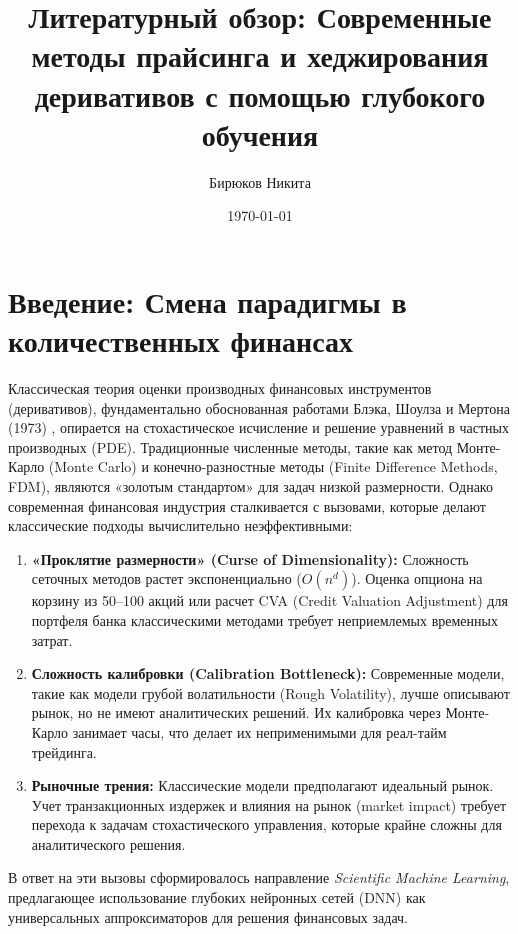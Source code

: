 \documentclass[12pt, a4paper]{article}
\title{\textbf{Литературный обзор: Современные методы прайсинга и хеджирования деривативов с помощью глубокого обучения}}
\author{Бирюков Никита}
\date{\today}
\begin{document}
\maketitle
\tableofcontents
\newpage

\section{Введение: Смена парадигмы в количественных финансах}

Классическая теория оценки производных финансовых инструментов (деривативов), фундаментально обоснованная работами Блэка, Шоулза и Мертона (1973) \cite{BlackScholes1973}, опирается на стохастическое исчисление и решение уравнений в частных производных (PDE). Традиционные численные методы, такие как метод Монте-Карло (Monte Carlo) и конечно-разностные методы (Finite Difference Methods, FDM), являются «золотым стандартом» для задач низкой размерности. Однако современная финансовая индустрия сталкивается с вызовами, которые делают классические подходы вычислительно неэффективными:
\begin{enumerate}
    \item \textbf{«Проклятие размерности» (Curse of Dimensionality):} Сложность сеточных методов растет экспоненциально ($O(n^d)$). Оценка опциона на корзину из 50--100 акций или расчет CVA (Credit Valuation Adjustment) для портфеля банка классическими методами требует неприемлемых временных затрат.
    \item \textbf{Сложность калибровки (Calibration Bottleneck):} Современные модели, такие как модели грубой волатильности (Rough Volatility), лучше описывают рынок, но не имеют аналитических решений. Их калибровка через Монте-Карло занимает часы, что делает их неприменимыми для реал-тайм трейдинга.
    \item \textbf{Рыночные трения:} Классические модели предполагают идеальный рынок. Учет транзакционных издержек и влияния на рынок (market impact) требует перехода к задачам стохастического управления, которые крайне сложны для аналитического решения.
\end{enumerate}

В ответ на эти вызовы сформировалось направление \textit{Scientific Machine Learning}, предлагающее использование глубоких нейронных сетей (DNN) как универсальных аппроксиматоров для решения финансовых задач.
\end{document}
